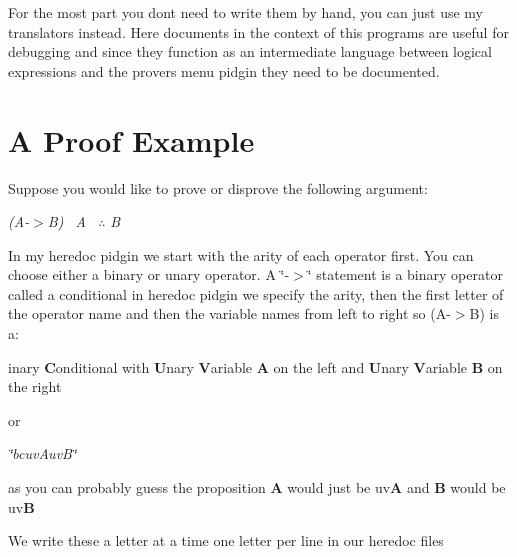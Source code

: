 For the most part you don\textquotesingle{}t need to write them by hand, you can just use my translators instead. Here documents in the context of this programs are useful for debugging and since they function as an intermediate language between logical expressions and the provers menu pidgin they need to be documented. \section*{A Proof Example}

Suppose you would like to prove or disprove the following argument\+: ~\newline


{\itshape  {\ttfamily  (A-\/$>$B)~\newline
 A~\newline
 {$\therefore$} B~\newline
 } }

In my heredoc pidgin we start with the arity of each operator first. You can choose either a binary or unary operator. A \char`\"{}-\/$>$\char`\"{} statement is a binary operator called a conditional in heredoc pidgin we specify the arity, then the first letter of the operator name and then the variable names from left to right so (A-\/$>$B) is a\+:

{inary {\bfseries C}onditional with {\bfseries U}nary {\bfseries V}ariable {\bfseries A} on the left and {\bfseries U}nary {\bfseries V}ariable {\bfseries B} on the right ~\newline
 }

or~\newline


{\itshape  {\ttfamily  \char`\"{}bcuv\+Auv\+B\char`\"{} } }

as you can probably guess the proposition {\bfseries A} would just be uv{\bfseries A} and {\bfseries B} would be uv{\bfseries B}

We write these a letter at a time one letter per line in our heredoc files

